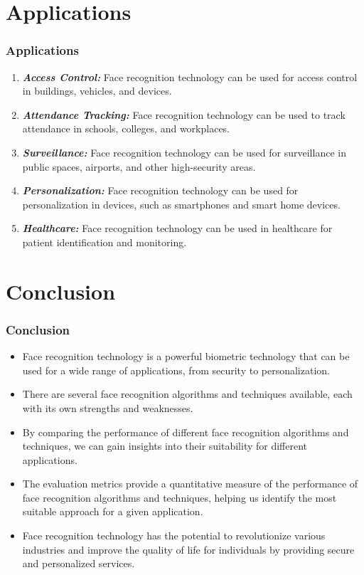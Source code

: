 \documentclass[aspectratio=169]{beamer}
\begin{document}
\section{Applications}
\begin{frame}
	\centering
	\frametitle{Applications}
	\begin{minipage}{0.95\textwidth}
		\begin{enumerate}
			\item \textbf{\textit{Access Control:}} Face recognition technology can be used for access control in buildings, vehicles, and devices.
			\item \textbf{\textit{Attendance Tracking:}} Face recognition technology can be used to track attendance in schools, colleges, and workplaces.
			\item \textbf{\textit{Surveillance:}} Face recognition technology can be used for surveillance in public spaces, airports, and other high-security areas.
			\item \textbf{\textit{Personalization:}} Face recognition technology can be used for personalization in devices, such as smartphones and smart home devices.
			\item \textbf{\textit{Healthcare:}} Face recognition technology can be used in healthcare for patient identification and monitoring.
		\end{enumerate}
	\end{minipage}
\end{frame}

\section{Conclusion}
\begin{frame}
	\centering
	\frametitle{Conclusion}

	\begin{minipage}{0.95\textwidth}
		\begin{itemize}
			\item Face recognition technology is a powerful biometric technology that can be used for a wide range of applications, from security to personalization.
			\item There are several face recognition algorithms and techniques available, each with its own strengths and weaknesses.
			\item By comparing the performance of different face recognition algorithms and techniques, we can gain insights into their suitability for different applications.
			\item The evaluation metrics provide a quantitative measure of the performance of face recognition algorithms and techniques, helping us identify the most suitable approach for a given application.
			\item Face recognition technology has the potential to revolutionize various industries and improve the quality of life for individuals by providing secure and personalized services.
		\end{itemize}
	\end{minipage}
\end{frame}
\end{document}
